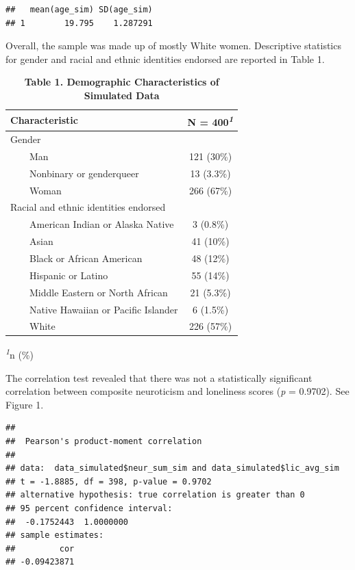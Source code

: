 \documentclass[
  english,
  man]{apa6}
\begin{document}
\begin{verbatim}
##   mean(age_sim) SD(age_sim)
## 1        19.795    1.287291
\end{verbatim}

Overall, the sample was made up of mostly White women. Descriptive statistics for gender and racial and ethnic identities endorsed are reported in Table 1.

\begin{table}[t]
\caption{\label{tab:demographics-table}\textbf{Table 1. Demographic Characteristics of Simulated Data}} 
\fontsize{12.0pt}{14.0pt}\selectfont
\begin{tabular*}{\linewidth}{@{\extracolsep{\fill}}lc}
\toprule
\textbf{Characteristic} & \textbf{N = 400}\textsuperscript{\textit{1}} \\ 
\midrule\addlinespace[2.5pt]
Gender &  \\ 
    Man & 121 (30\%) \\ 
    Nonbinary or genderqueer & 13 (3.3\%) \\ 
    Woman & 266 (67\%) \\ 
Racial and ethnic identities endorsed &  \\ 
    American Indian or Alaska Native & 3 (0.8\%) \\ 
    Asian & 41 (10\%) \\ 
    Black or African American & 48 (12\%) \\ 
    Hispanic or Latino & 55 (14\%) \\ 
    Middle Eastern or North African & 21 (5.3\%) \\ 
    Native Hawaiian or Pacific Islander & 6 (1.5\%) \\ 
    White & 226 (57\%) \\ 
\bottomrule
\end{tabular*}
\begin{minipage}{\linewidth}
\textsuperscript{\textit{1}}n (\%)\\
\end{minipage}
\end{table}

The correlation test revealed that there was not a statistically significant correlation between composite neuroticism and loneliness scores (\emph{p} = 0.9702). See Figure 1.

\begin{verbatim}
## 
##  Pearson's product-moment correlation
## 
## data:  data_simulated$neur_sum_sim and data_simulated$lic_avg_sim
## t = -1.8885, df = 398, p-value = 0.9702
## alternative hypothesis: true correlation is greater than 0
## 95 percent confidence interval:
##  -0.1752443  1.0000000
## sample estimates:
##         cor 
## -0.09423871
\end{verbatim}
\end{document}
